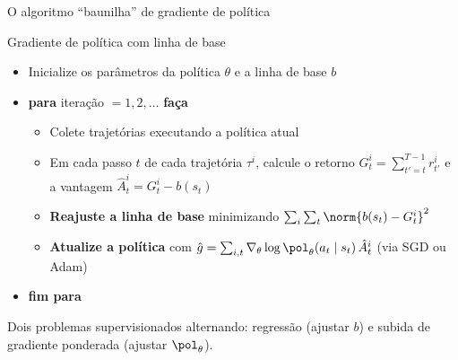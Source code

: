 \documentclass[aspectratio=169, 11pt]{beamer}
\newcommand{\thv}{\theta}                       %
\newcommand{\polth}{\pol_{\thv}}                %
\newcommand{\gth}{\nabla_{\thv}}                %
\newcommand{\traj}{\tau}                        %
\newcommand{\Ahat}{\hat{A}}
\begin{document}
\begin{frame}{O algoritmo ``baunilha'' de gradiente de política}

  \begin{algbox}{Gradiente de política com linha de base}
    {\footnotesize
    \begin{itemize}\setlength{\itemsep}{0.15ex}
      \item Inicialize os parâmetros da política $\thv$ e a linha de base $b$
      \item \textbf{para} iteração $=1,2,\dots$ \textbf{faça}
        \begin{itemize}\setlength{\itemsep}{0.1ex}
          \item Colete trajetórias executando a política atual
          \item Em cada passo $t$ de cada trajetória $\traj^i$, calcule o
            retorno $G^i_t = \sum_{t'=t}^{T-1} r^i_{t'}$ e a vantagem
            $\Ahat^i_t = G^i_t - b(s_t)$
          \item \textbf{Reajuste a linha de base} minimizando
            $\sum_i \sum_t \norm{b(s_t) - G^i_t}^2$
          \item \textbf{Atualize a política} com
            $\hat{g} = \sum_{i,t} \gth \log \polth(a_t\mid s_t)\, \Ahat^i_t$
            (via SGD ou Adam)
        \end{itemize}
      \item \textbf{fim para}
    \end{itemize}}
  \end{algbox}

  \vspace{-0.6em}
  \begin{ideiabox}
    Dois problemas supervisionados alternando: regressão (ajustar $b$) e
    subida de gradiente ponderada (ajustar $\polth$).
  \end{ideiabox}
\end{frame}
\end{document}
